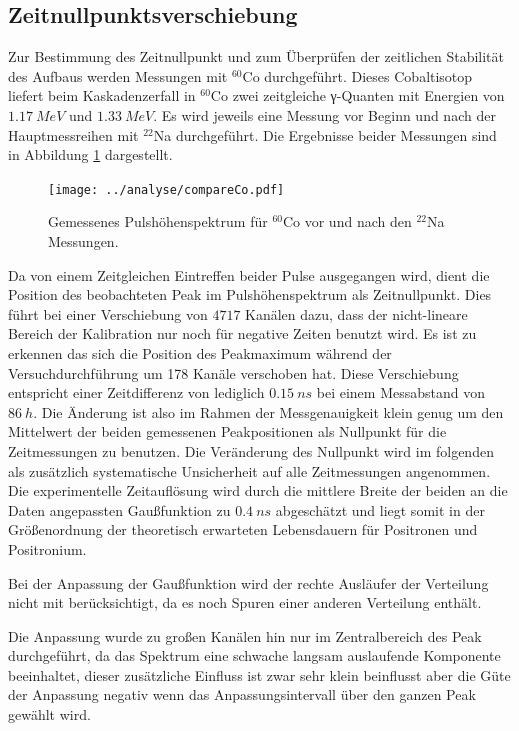 \documentclass[a4paper,12pt]{article}
\begin{document}
\subsection{Zeitnullpunktsverschiebung}\label{cap:zeitverschiebung}

Zur Bestimmung des Zeitnullpunkt und zum Überprüfen der zeitlichen Stabilität des Aufbaus werden Messungen mit
$^{60}$Co durchgeführt.
Dieses Cobaltisotop liefert beim Kaskadenzerfall in $^{60}$Co zwei zeitgleiche γ-Quanten mit Energien von $\SI{1.17}{MeV}$ und $\SI{1.33}{MeV}$. Es wird jeweils eine Messung vor Beginn
und nach der Hauptmessreihen mit $^{22}$Na durchgeführt. Die Ergebnisse beider Messungen sind in Abbildung \ref{fig:compare_co} dargestellt.

\begin{figure}
	\texttt{[image: ../analyse/compareCo.pdf]}
	\caption{Gemessenes Pulshöhenspektrum für $^{60}$Co vor und nach den $^{22}$Na Messungen.}
	\label{fig:compare_co}
\end{figure}

Da von einem Zeitgleichen Eintreffen beider Pulse ausgegangen wird, dient die Position des beobachteten Peak im Pulshöhenspektrum als Zeitnullpunkt.
Dies führt bei einer Verschiebung von $4717$ Kanälen dazu, dass der nicht-lineare Bereich der
Kalibration nur noch für negative Zeiten benutzt wird.
Es ist zu erkennen das sich die Position des Peakmaximum während der Versuchdurchführung um 178 Kanäle verschoben hat. Diese Verschiebung entspricht einer
Zeitdifferenz von lediglich $\SI{0.15}{ns}$ bei einem Messabstand von $\SI{86}{h}$.
Die Änderung ist also im Rahmen der Messgenauigkeit klein genug um den Mittelwert der
beiden gemessenen Peakpositionen als Nullpunkt für die Zeitmessungen zu benutzen. Die Veränderung des Nullpunkt wird im folgenden
als zusätzlich systematische Unsicherheit auf alle Zeitmessungen angenommen. Die experimentelle Zeitauflösung wird durch die mittlere Breite der beiden an die
Daten angepassten Gaußfunktion zu $\SI{0.4}{ns}$ abgeschätzt und liegt somit in der Größenordnung der theoretisch erwarteten Lebensdauern für Positronen und Positronium.

Bei der Anpassung der Gaußfunktion wird der rechte Ausläufer der Verteilung nicht mit
berücksichtigt, da es noch Spuren einer anderen Verteilung enthält.


Die Anpassung wurde zu großen Kanälen hin nur im Zentralbereich des Peak durchgeführt, da das Spektrum eine schwache langsam auslaufende Komponente beeinhaltet, 
dieser zusätzliche Einfluss ist zwar sehr klein beinflusst aber die Güte der Anpassung negativ wenn das Anpassungsintervall über den ganzen Peak gewählt wird.
\end{document}

